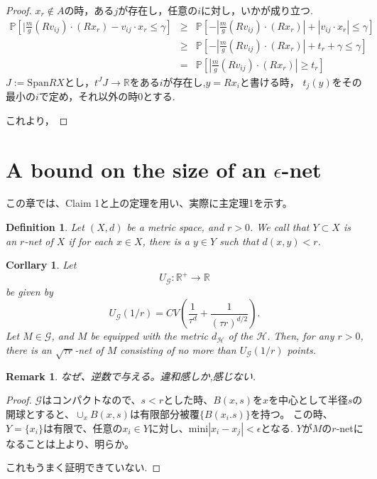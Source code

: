 \documentclass{ujarticle}
\newtheorem{dfn}[thm]{Definition}
\newtheorem{cor}[thm]{Corllary}
\newtheorem*{rem}{Remark}
\begin{document}
\begin{proof}
$x_r \notin A$の時，ある$j$が存在し，任意の$i$に対し，いかが成り立つ.
\begin{eqnarray*}
  \mathbb{P} [ | \frac{m}{g}(Rv_{ij})\cdot (Rx_r) - v_{ij} \cdot  x_r \le  \gamma ]
  & \ge  & \mathbb{P} [ - | \frac{m}{g}(Rv_{ij})\cdot (Rx_r)| + |v_{ij} \cdot  x_r| \le  \gamma ] \\
  & \ge & \mathbb{P} [ - | \frac{m}{g}(Rv_{ij})\cdot (Rx_r)| +  t_r +  \gamma  \le  \gamma ] \\
  & =&  \mathbb{P} [ | \frac{m}{g}(Rv_{ij})\cdot (Rx_r)| \ge  t_r  ]
\end{eqnarray*}
$J:=\mathrm{Span}RX$とし，$t^J J \to \mathbb{R}$をある$i$が存在し,$y=Rx_i$と書ける時，
$t_j(y)$をその最小の$i$で定め，それ以外の時$0$とする.

これより，
\end{proof}




\section{A bound on the size of an $\epsilon$-net}
\label{a bound on the size of an epsilon net}
この章では、Claim 1と上の定理を用い、実際に主定理1を示す。

\begin{dfn}
 Let $(X,d)$ be a metric space, and $r > 0$. We call that $Y \subset X$ is an $r$-net of $X$
 if   for each $x \in X$, there is a $y \in Y$ such that $d(x,y) < r$.
\end{dfn}

\begin{cor} Let
  \begin{equation*}
   U_{\mathcal{G}}:\mathbb{R}^{+} \to \mathbb{R}
  \end{equation*}
be given by
\begin{equation*}
 U_{\mathcal{G}}(1/r) = CV ( \frac{ 1 }{\tau^d }  + \frac{ 1 }{ (\tau r)^{d/2} }).
\end{equation*}
Let $M \in \mathcal{G}$, and $M$ be equipped with the metric $d_{\mathcal{H}}$ of the $\mathcal{H}$.
Then, for any $r >0$, there is an $\sqrt{\tau r}$-net of $M$ consisting of no more than $U_{\mathcal{G}}(1/r)$ points.
\end{cor}
\begin{rem}
 なぜ、逆数で与える。違和感しか,感じない.
\end{rem}

\begin{proof}
  $\mathcal{G}$はコンパクトなので、$ s < r$とした時、$B(x,s)$を$x$を中心として半径$s$の開球とすると、$\cup_x B(x,s)$は有限部分被覆$\{ B(x_i.s) \}$を持つ。
  この時、$Y=\{ x_i \}$は有限で、任意の$x_i \in Y$に対し、$\mathrm{mini}|x_ i -x_j| < \epsilon$となる.
  $Y$が$M$の$r$-netになることは上より、明らか。

これもうまく証明できていない.
\end{proof}
\end{document}
